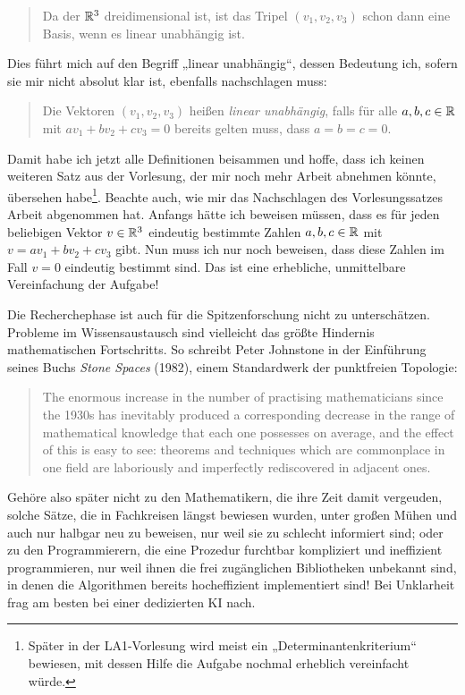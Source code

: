 \begin{phaseone}[Recherche]
    \begin{quote}
        Da der $\mathbb R^3$ dreidimensional ist, ist das Tripel $(v_1,v_2,v_3)$ schon dann eine Basis, wenn es linear unabhängig ist.
    \end{quote}
    Dies führt mich auf den Begriff „linear unabhängig“, dessen Bedeutung ich, sofern sie mir nicht absolut klar ist, ebenfalls nachschlagen muss:
    \begin{quote}
        Die Vektoren $(v_1,v_2,v_3)$ heißen \emph{linear unabhängig}, falls für alle $a,b,c\in \mathbb R$ mit $av_1+bv_2+cv_3=0$ bereits gelten muss, dass $a=b=c=0$.
    \end{quote}
    Damit habe ich jetzt alle Definitionen beisammen und hoffe, dass ich keinen weiteren Satz aus der Vorlesung, der mir noch mehr Arbeit abnehmen könnte, übersehen habe\footnote{Später in der LA1-Vorlesung wird meist ein „Determinantenkriterium“ bewiesen, mit dessen Hilfe die Aufgabe nochmal erheblich vereinfacht würde.}. Beachte auch, wie mir das Nachschlagen des Vorlesungssatzes Arbeit abgenommen hat. Anfangs hätte ich beweisen müssen, dass es für jeden beliebigen Vektor $v\in \mathbb R^3$ eindeutig bestimmte Zahlen $a,b,c\in \mathbb R$ mit $v=av_1+bv_2+cv_3$ gibt. Nun muss ich nur noch beweisen, dass diese Zahlen im Fall $v=0$ eindeutig bestimmt sind. Das ist eine erhebliche, unmittelbare Vereinfachung der Aufgabe!
\end{phaseone}


\begin{bem}
    Die Recherchephase ist auch für die Spitzenforschung nicht zu unterschätzen. Probleme im Wissensaustausch sind vielleicht das größte Hindernis mathematischen Fortschritts. So schreibt Peter Johnstone in der Einführung seines Buchs \emph{Stone Spaces} (1982), einem Standardwerk der punktfreien Topologie:
    \begin{quote}
        The enormous increase in the number of practising mathematicians since the 1930s has inevitably produced a corresponding decrease in the range of mathematical knowledge that each one possesses on average, and the effect of this is easy to see: theorems and techniques which are commonplace in one field are laboriously and imperfectly rediscovered in adjacent ones.
    \end{quote}
    Gehöre also später nicht zu den Mathematikern, die ihre Zeit damit vergeuden, solche Sätze, die in Fachkreisen längst bewiesen wurden, unter großen Mühen und auch nur halbgar neu zu beweisen, nur weil sie zu schlecht informiert sind; oder zu den Programmierern, die eine Prozedur furchtbar kompliziert und ineffizient programmieren, nur weil ihnen die frei zugänglichen Bibliotheken unbekannt sind, in denen die Algorithmen bereits hocheffizient implementiert sind! Bei Unklarheit frag am besten bei einer dedizierten KI nach.
\end{bem}


